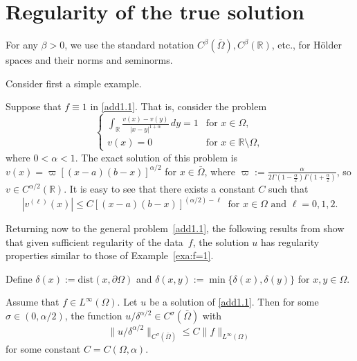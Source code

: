 \documentclass[smallextended]{svjour3}       %
\begin{document}
%
%
\section{Regularity of the true solution}\label{sec:regularity}

For any $\beta>0$, we use the standard notation $C^\beta(\bar\Omega),C^\beta(\mathbb{R})$, etc.,  for H\"older spaces and their norms and seminorms.

Consider first a simple example.

\begin{example}\label{exa:f=1}
	Suppose that $f\equiv 1$ in \eqref{add1.1}. That is, consider the problem
	\[ %
	\begin{cases}\displaystyle
		\int_{\mathbb{R}}{\frac{v\left( x \right) -v\left( y \right)}{\left| x-y \right|^{1+\alpha}}\,dy}=1 &\text{for }	x\in \Omega,  \\[3mm]
		v(x) =0 &\text{for } x\in\mathbb{R} \setminus \Omega,
	\end{cases}
	\] %
	where $0<\alpha <1$. The exact solution of this problem is
	$v(x)=\varpi \left[ (x-a)\left( b-x \right) \right] ^{\alpha/2}$ for $x\in \bar\Omega$,
	where $\varpi := \frac{\alpha }{2\varGamma \left( 1-\frac{\alpha}{2} \right) \varGamma \left( 1+\frac{\alpha}{2} \right)}$, so $v\in C^{\alpha/2}(\mathbb{R})$.
	It is easy to see that there exists a constant $C$ such that
	\[
	\left|v^{(\ell)}(x)\right|\le C[(x-a)(b-x)]^{(\alpha/2)-\ell} \ \text{ for } x\in\Omega \text{ and } \ell=0,1,2.
	\]
\end{example}

Returning now to the general problem~\eqref{add1.1}, the following results from \cite{RosOtonSerra:14} show that given sufficient regularity of the data~$f$, the solution $u$ has regularity properties similar to those of Example~\ref{exa:f=1}.

Define $\delta(x):= \text{dist}(x,\partial\Omega)$ and  $\delta(x,y):= \min\{\delta(x), \delta(y)\}$ for $x,y\in\Omega$.

\begin{theorem}\label{Th1}\cite[Theorem~1.2]{RosOtonSerra:14}
	Assume that $f \in L^\infty(\Omega)$. Let $u$ be a solution of \eqref{add1.1}. Then for some $\sigma\in (0,\alpha/2)$, the function $u/\delta^{\alpha/2} \in C^\sigma(\bar\Omega)$ with
	\[
	\| u/\delta^{\alpha/2} \|_{C^{\sigma}(\bar\Omega)} \le C \|f\|_{L^\infty(\Omega)}
	\]
	for some constant $C = C(\Omega,\alpha)$.
\end{theorem}
\end{document}
